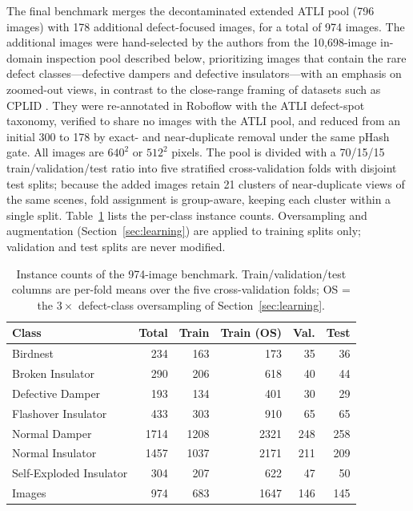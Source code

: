 \documentclass[conference]{IEEEtran}
\newcommand{\dd}{Defective Damper}
\begin{document}
The final benchmark merges the decontaminated extended ATLI pool (796 images) with 178 additional defect-focused images, for a total of 974 images. The additional images were hand-selected by the authors from the 10{,}698-image in-domain inspection pool described below, prioritizing images that contain the rare defect classes---defective dampers and defective insulators---with an emphasis on zoomed-out views, in contrast to the close-range framing of datasets such as CPLID \cite{tao2020insulator}. They were re-annotated in Roboflow with the ATLI defect-spot taxonomy, verified to share no images with the ATLI pool, and reduced from an initial 300 to 178 by exact- and near-duplicate removal under the same pHash gate. All images are $640^2$ or $512^2$ pixels. The pool is divided with a 70/15/15 train/validation/test ratio into five stratified cross-validation folds with disjoint test splits; because the added images retain 21 clusters of near-duplicate views of the same scenes, fold assignment is group-aware, keeping each cluster within a single split. Table~\ref{tab:instances} lists the per-class instance counts. Oversampling and augmentation (Section~\ref{sec:learning}) are applied to training splits only; validation and test splits are never modified.

\begin{table}[t]
\caption{Instance counts of the 974-image benchmark. Train/validation/test columns are per-fold means over the five cross-validation folds; OS = the $3\times$ defect-class oversampling of Section~\ref{sec:learning}.}
\label{tab:instances}
\centering
\footnotesize
\setlength{\tabcolsep}{3.5pt}
\begin{tabular}{lrrrrr}
\toprule
Class & Total & Train & Train (OS) & Val. & Test \\
\midrule
Birdnest & 234 & 163 & 173 & 35 & 36 \\
Broken Insulator & 290 & 206 & 618 & 40 & 44 \\
\dd{} & 193 & 134 & 401 & 30 & 29 \\
Flashover Insulator & 433 & 303 & 910 & 65 & 65 \\
Normal Damper & 1714 & 1208 & 2321 & 248 & 258 \\
Normal Insulator & 1457 & 1037 & 2171 & 211 & 209 \\
Self-Exploded Insulator & 304 & 207 & 622 & 47 & 50 \\
\midrule
Images & 974 & 683 & 1647 & 146 & 145 \\
\bottomrule
\end{tabular}
\end{table}
\end{document}
